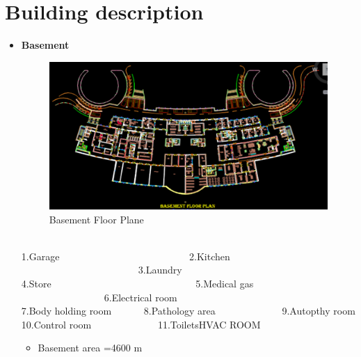 \documentclass[12pt,fleqn]{book} %
\begin{document}
	\section{Building description}
	\begin{itemize}
	    \item \textbf{Basement}
	    \begin{figure}[h!]
    \centering
    \includegraphics[width=0.6\linewidth]{i 1.png}
    \caption{ Basement Floor Plane}
    \label{fig:i 1}
\end{figure}

\\    1.Garage \ \ \ \ \ \ \ \ \ \ \ \ \ \ \ \ \ \ \ \ \ \ \ \ \ \ 2.Kitchen \ \ \ \ \ \ \ \ \ \ \ \ \ \ \ \ \ \ \ \ \ \ \ \ 3.Laundry \ \ \ \ \ \ \ \ \ \ \ \  
\\ 4.Store \ \ \ \ \ \ \ \ \ \ \ \ \ \ \ \ \ \ \ \ \ \ \ \ \ \ \ \ \ 5.Medical gas \ \ \ \ \ \ \ \ \ \ \ \  \ \ \ \ \  6.Electrical room \ \ \ \ \ \ \ \ \ \ \ \ 
\\7.Body holding room \ \ \ \ \ \  8.Pathology area \ \ \ \ \ \ \ \ \ \ \ \ \ 9.Autopthy room  
\\10.Control room \ \ \ \ \ \ \ \ \ \ \ \ \ 11.ToiletsHVAC ROOM
\begin{itemize}
    \item Basement area =4600 m
\end{itemize}



\end{itemize}
\end{document}
